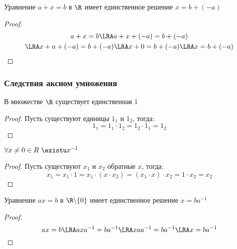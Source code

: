\documentclass[a4paper, 14pt]{article}
\begin{document}
    \begin{theorem}
        Уравнение $a + x = b$ в $\R$ имеет единственное решение $x = b + (-a)$
    \end{theorem}
    \begin{proof}
        \begin{multline*}
            a + x = b \LRA a + x + (-a) = b + (-a) \\ \LRA x + a + (-a) = b + (-a) \LRA x + 0 = b + (-a) \LRA x = b + (-a)
        \end{multline*}
    \end{proof}

    \subsubsection*{Следствия аксиом умножения}
    \begin{theorem}
        В множестве $\R$ существует единственная $1$
    \end{theorem}
    \begin{proof}
        Пусть существуют единицы $1_1$ и $1_2$, тогда:
        \begin{equation*}
            1_1 = 1_1 \cdot 1_2 = 1_2 \cdot 1_1 = 1_2
        \end{equation*}
    \end{proof}

    \begin{theorem}
        $\forall x \neq 0 \in R \ \existu x^{-1}$ 
    \end{theorem}
    \begin{proof}
        Пусть существуют $x_1$ и $x_2$ обратные $x$, тогда:
        \begin{equation*}
            x_1 = x_1 \cdot 1 = x_1 \cdot (x \cdot x_2) = (x_1 \cdot x) \cdot x_2 = 1 \cdot x_2 = x_2
        \end{equation*}
    \end{proof}

    \begin{theorem}
        Уравнение $ax = b$ в $\R \backslash \{0\}$ имеет единственное решение $x = ba^{-1}$
    \end{theorem}
    \begin{proof}
        \begin{equation*}
            ax = b \LRA axa^{-1} = ba^{-1} \LRA xaa^{-1} = ba^{-1} \LRA x = ba^{-1}
        \end{equation*}
    \end{proof}
\end{document}
